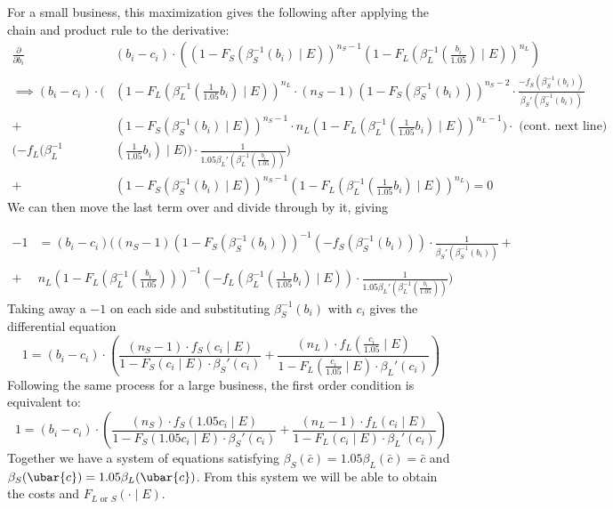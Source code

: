 For a small business, this maximization gives the following after applying
the chain and product rule to the derivative:
\[
  \begin{aligned}
  \frac{\partial}{\partial b_i} & (b_i - c_i) \cdot \left(
    \left( 1 - F_S(\beta_{S}^{-1}(b_i) \mid E) \right)^{n_S - 1}
    \left( 1 - F_L(\beta_{L}^{-1}(\frac{b_i}{1.05}) \mid E) \right)^{n_L} \right) \\
  \implies (b_{i} - c_{i}) \cdot (
  & \left( 1 - F_L(\beta_{L}^{-1}(\frac{1}{1.05}b_i) \mid E) \right)^{n_L} \cdot
  (n_S - 1)(1 - F_S(\beta_{S}^{-1}(b_i)))^{n_S - 2} \cdot
  \frac{-f_{S}(\beta_{S}^{-1}(b_i))}{\beta_{S}'(\beta_{S}^{-1}(b_i))} \\
  + & \left( 1 - F_S(\beta_{S}^{-1}(b_i) \mid E) \right)^{n_S - 1} \cdot
  n_L (1 - F_L(\beta_{L}^{-1}(\frac{1}{1.05}b_i) \mid E) )^{n_L - 1}) \cdot \text{ (cont. next line)}\\
  (-f_{L}(\beta_{L}^{-1} & (\frac{1}{1.05}b_i) \mid E))
  \cdot \frac{1}{1.05 \beta_{L}'(\beta_{L}^{-1}(\frac{b_i}{1.05}))}) \\
  + & \left( 1 - F_S(\beta_{S}^{-1}(b_i) \mid E) \right)^{n_S - 1}
    \left( 1 - F_L(\beta_{L}^{-1}(\frac{1}{1.05}b_i) \mid E) \right)^{n_L} ) = 0
  \end{aligned}
\]
We can then move the last term over and divide through by it, giving

\[
\begin{aligned}
-1 &= (b_i - c_i) ( (n_S - 1) 
  (1 - F_S(\beta_{S}^{-1}(b_i)))^{-1} (-f_{S}(\beta_{S}^{-1}(b_i)))
  \cdot \frac{1}{\beta_{S}'(\beta_{S}^{-1}(b_i))} + \\
+ & n_L (1 - F_L(\beta_{L}^{-1}(\frac{b_i}{1.05})))^{-1} 
  (-f_{L}(\beta_{L}^{-1}(\frac{1}{1.05}b_i) \mid E))
  \cdot \frac{1}{1.05 \beta_{L}'(\beta_{L}^{-1}(\frac{b_i}{1.05}))})
\end{aligned}
\]
Taking away a \(-1\) on each side and substituting \(\beta_{S}^{-1}(b_i)\)
with \(c_i\) gives the differential equation
\[
  1 = (b_i - c_i) \cdot \left(
    \frac{(n_S - 1) \cdot f_S(c_i \mid E)}{1 - F_S(c_i \mid E) \cdot \beta_S'(c_i)} +
    \frac{(n_L) \cdot f_L(\frac{c_i}{1.05} \mid E)}{1 - F_L(\frac{c_i}{1.05} \mid E) \cdot \beta_L'(c_i)} \right)
\]
Following the same process for a large business, the first order condition is equivalent to:
\[
  1 = (b_i - c_i) \cdot \left(
    \frac{(n_S) \cdot f_S(1.05 c_i \mid E)}{1 - F_S(1.05 c_i \mid E) \cdot \beta_S'(c_i)} +
    \frac{(n_L - 1) \cdot f_L(c_i \mid E)}{1 - F_L(c_i \mid E) \cdot \beta_L'(c_i)} \right)
\]
Together we have a system of equations satisfying
\( \beta_S (\bar{c}) = 1.05 \beta_L (\bar{c}) = \bar{c}\) and
\( \beta_S( \ubar{c} ) = 1.05 \beta_L( \ubar{c} ) \).
From this system we will be able to obtain the costs and
\(F_{L \text{ or } S}(\cdot \mid E)\).
